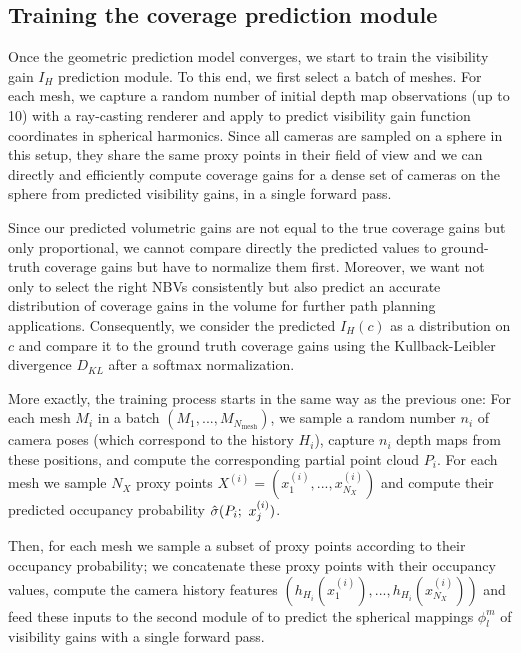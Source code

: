 {\subsection{Training the coverage prediction module}

Once the geometric prediction model converges, we start to train the visibility gain $I_H$ prediction module. To this end, we first select a batch of meshes. For each mesh, we capture a random number of initial depth map observations (up to 10) with a ray-casting renderer and apply \method to predict visibility gain function coordinates in spherical harmonics. Since all cameras are sampled on a sphere in this setup, they share the same proxy points  in their field of view and we can directly and efficiently compute coverage gains for a dense set of cameras on the sphere from predicted visibility gains, in a single forward pass.

Since our predicted volumetric gains are not equal to the true coverage gains but only proportional, we cannot compare directly the predicted values to ground-truth coverage gains but have to normalize them first. Moreover, we want \method not only to select the right NBVs consistently but also predict an accurate distribution of coverage gains in the volume for further path planning applications. Consequently, we consider the predicted $I_H(c)$ as a distribution on $c$ and compare it to the ground truth coverage gains using the Kullback-Leibler divergence $D_{KL}$ after a softmax normalization. 

More exactly, the training process starts in the same way as the previous one: For each mesh $M_i$ in a batch $(M_1,...,M_{N_{\text{mesh}}})$, we sample a random number $n_i$ of camera poses (which correspond to the history $H_i$), capture $n_i$ depth maps from these positions, and compute the corresponding partial point cloud $P_i$. For each mesh we sample $N_X$ proxy points $X^{(i)} = (x_1^{(i)},...,x_{N_X}^{(i)})$ and compute their predicted occupancy probability $\hat{\sigma}(P_i;\ x_j^{(i)})$. 

Then, for each mesh we sample a subset of proxy points according to their occupancy probability; we concatenate these proxy points with their occupancy values, compute the camera history features $(h_{H_i}(x_1^{(i)}), ..., h_{H_i}(x_{N_X}^{(i)}))$ and feed these inputs to the second module of \method to predict the spherical mappings $\phi_l^m$ of visibility gains with a single forward pass. 

}
